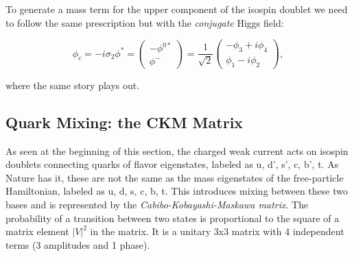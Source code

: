 To generate a mass term for the upper component of the isospin doublet we need to follow the same prescription but with the \textit{conjugate} Higgs field:

\begin{equation}
\phi_{c} = - i \sigma_{2} \phi^{*}
= \begin{pmatrix} -\phi^{0*} \\ \phi^{-} \end{pmatrix} = \frac{1}{\sqrt{2}} \begin{pmatrix} -\phi_{3} + i\phi_{4} \\  \phi_{1} - i \phi_{2} \end{pmatrix},
\end{equation}

where the same story plays out.


\subsection{Quark Mixing: the CKM Matrix}

As seen at the beginning of this section, the charged weak current acts on isospin doublets connecting quarks of flavor eigenstates, labeled as u, d', s', c, b', t. As Nature has it, these are not the same as the mass eigenstates of the free-particle Hamiltonian, labeled as u, d, s, c, b, t. This introduces mixing between these two bases and is represented by the \textit{Cabibo-Kobayashi-Maskawa matrix}. The probability of a transition between two states is proportional to the square of a matrix element $|V|^{2}$ in the matrix. It is a unitary 3x3 matrix with 4 independent terms (3 amplitudes and 1 phase).

